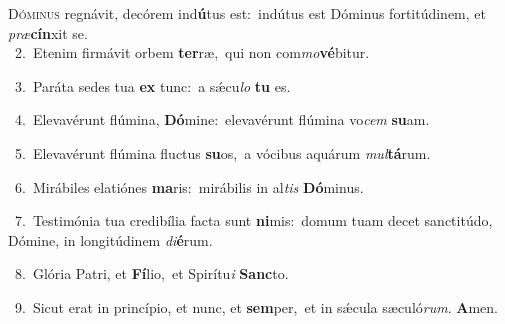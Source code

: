 \lettrine{\initial\textcolor{\initialcolor}{D}}{óminus} regnávit, decórem ind\-\textbf{ú}\-tus est:~\star indútus est Dóminus fortitúdinem, et \textit{præ}\-\textbf{cín}xit se.\\
{\numbfont\textcolor{\numbcolor}{~2.}}~Etenim firmávit orbem \textbf{ter}\-ræ,~\star qui non com\-\textit{mo}\-\textbf{vé}bitur.\par
{\numbfont\textcolor{\numbcolor}{~3.}}~Paráta sedes tua \textbf{ex} tunc:~\star a sǽcu\textit{lo} \textbf{tu} es.\par
{\numbfont\textcolor{\numbcolor}{~4.}}~Elevavérunt flúmina, \textbf{Dó}\-mine:~\star elevavérunt flúmina vo\textit{cem} \textbf{su}\-am.\par
{\numbfont\textcolor{\numbcolor}{~5.}}~Elevavérunt flúmina fluctus \textbf{su}\-os,~\star a vócibus aquárum \textit{mul}\-\textbf{tá}rum.\par
{\numbfont\textcolor{\numbcolor}{~6.}}~Mirábiles elatiónes \textbf{ma}\-ris:~\star mirábilis in al\textit{tis} \textbf{Dó}\-minus.\par
{\numbfont\textcolor{\numbcolor}{~7.}}~Testimónia tua credibília facta sunt \textbf{ni}\-mis:~\star domum tuam decet sanctitúdo, Dómine, in longitúdinem \textit{di}\-\textbf{é}rum.\par
{\numbfont\textcolor{\numbcolor}{~8.}}~Glória Patri, et \textbf{Fí}\-lio,~\star et Spirítu\textit{i} \textbf{Sanc}\-to.\par
{\numbfont\textcolor{\numbcolor}{~9.}}~Sicut erat in princípio, et nunc, et \textbf{sem}\-per,~\star et in sǽcula sæculó\-\textit{rum}\-. \textbf{A}\-men.\par
